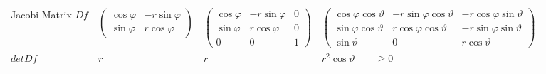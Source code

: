 \begin{tabular}{|p{2.5cm}||p{3cm}|p{4.2cm}|p{7.5cm}|}
\begin{minipage}{7.5cm}
    \vspace{0.1cm}
    \end{minipage}\\
	\hline
	Jacobi-Matrix $Df$ &
	\begin{minipage}{3cm}
    \vspace{0.1cm}
		$\begin{pmatrix}
         	\cos\varphi & -r\sin\varphi\\
         	\sin\varphi & r\cos\varphi
         \end{pmatrix}$
    \vspace{0.1cm}
    \end{minipage}&	
	\begin{minipage}{4.2cm}
    \vspace{0.1cm}
		$\begin{pmatrix}
         	\cos\varphi & -r\sin\varphi & 0\\
         	\sin\varphi & r\cos\varphi & 0\\
         	0 & 0 & 1
         \end{pmatrix}$
    \vspace{0.1cm}
    \end{minipage}&	
	\begin{minipage}{7.5cm}
    \vspace{0.1cm}
		$\begin{pmatrix}
         	\cos\varphi\cos\vartheta & -r\sin\varphi\cos\vartheta &
         	-r\cos\varphi\sin\vartheta\\
         	\sin\varphi\cos\vartheta & r\cos\varphi\cos\vartheta &
         	-r\sin\varphi\sin\vartheta\\
         	\sin\vartheta & 0 & r\cos\vartheta
         \end{pmatrix}$
    \vspace{0.1cm}
    \end{minipage}\\
	\hline
	\begin{minipage}{2.5cm}
    	\vspace{0.1cm}
  		$detDf$   
  		\vspace{0.1cm}
    \end{minipage}&
		$r$ &
		$r$ &
		$r^2\cos\vartheta \qquad \geq 0$\\
	\hline	
\end{tabular}